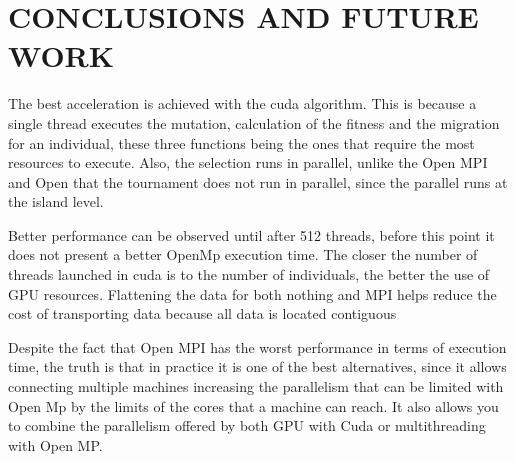 \documentclass{IEEEtran}
\begin{document}




\section{CONCLUSIONS AND FUTURE WORK}

The best acceleration is achieved with the cuda algorithm. This is because a single thread executes the mutation, calculation of the fitness and the migration for an individual, these three functions being the ones that require the most resources to execute. Also, the selection runs in parallel, unlike the Open MPI and Open that the tournament does not run in parallel, since the parallel runs at the island level.

Better performance can be observed until after 512 threads, before this point it does not present a better OpenMp execution time. The closer the number of threads launched in cuda is to the number of individuals, the better the use of GPU resources. Flattening the data for both nothing and MPI helps reduce the cost of transporting data because all data is located contiguous

Despite the fact that Open MPI has the worst performance in terms of execution time, the truth is that in practice it is one of the best alternatives, since it allows connecting multiple machines increasing the parallelism that can be limited with Open Mp by the limits of the cores that a machine can reach. It also allows you to combine the parallelism offered by both GPU with Cuda or multithreading with Open MP.
\end{document}
